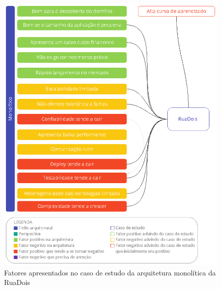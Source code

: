 \begin{figure}[h]
  \centering
  \includegraphics[keepaspectratio=true,scale=1]{figuras/analise-mono-ruadois.eps}
  \caption{Fatores apresentados no caso de estudo da arquitetura monolítica da RuaDois\label{fig:sintese-mono-ruadois}}
\end{figure}

